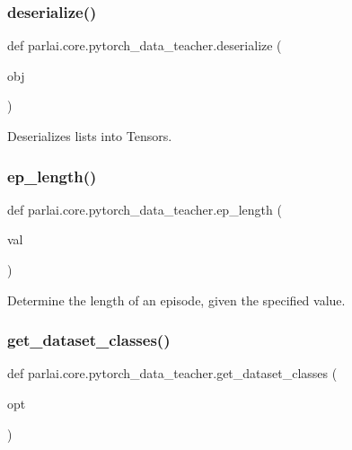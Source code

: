 \subsubsection{\texorpdfstring{deserialize()}{deserialize()}}
{\footnotesize\ttfamily def parlai.\+core.\+pytorch\+\_\+data\+\_\+teacher.\+deserialize (\begin{DoxyParamCaption}\item[{}]{obj }\end{DoxyParamCaption})}

\begin{DoxyVerb}Deserializes lists into Tensors.
\end{DoxyVerb}
 \mbox{\label{namespaceparlai_1_1core_1_1pytorch__data__teacher_afbd22acd239efcdb6afb94db83ee3493}} 
\subsubsection{\texorpdfstring{ep\+\_\+length()}{ep\_length()}}
{\footnotesize\ttfamily def parlai.\+core.\+pytorch\+\_\+data\+\_\+teacher.\+ep\+\_\+length (\begin{DoxyParamCaption}\item[{}]{val }\end{DoxyParamCaption})}

\begin{DoxyVerb}Determine the length of an episode, given the specified value.
\end{DoxyVerb}
 \mbox{\label{namespaceparlai_1_1core_1_1pytorch__data__teacher_acd56d9ac5d68831c1e91690f26eb2328}} 
\subsubsection{\texorpdfstring{get\+\_\+dataset\+\_\+classes()}{get\_dataset\_classes()}}
{\footnotesize\ttfamily def parlai.\+core.\+pytorch\+\_\+data\+\_\+teacher.\+get\+\_\+dataset\+\_\+classes (\begin{DoxyParamCaption}\item[{}]{opt }\end{DoxyParamCaption})}

